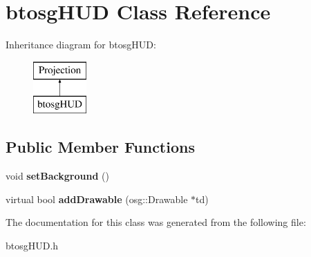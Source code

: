 \hypertarget{classbtosgHUD}{}\section{btosg\+H\+UD Class Reference}
\label{classbtosgHUD}
Inheritance diagram for btosg\+H\+UD\+:\begin{figure}[H]
\begin{center}
\leavevmode
\includegraphics[height=2.000000cm]{classbtosgHUD}
\end{center}
\end{figure}
\subsection*{Public Member Functions}
\begin{DoxyCompactItemize}
\item 
\mbox{\label{classbtosgHUD_a18c1eb80934574e6bdabbbee43e0bfeb}} 
void {\bfseries set\+Background} ()
\item 
\mbox{\label{classbtosgHUD_a182be3e4bdf00f9ff2b9c482833089a4}} 
virtual bool {\bfseries add\+Drawable} (osg\+::\+Drawable $\ast$td)
\end{DoxyCompactItemize}


The documentation for this class was generated from the following file\+:\begin{DoxyCompactItemize}
\item 
btosg\+H\+U\+D.\+h\end{DoxyCompactItemize}
